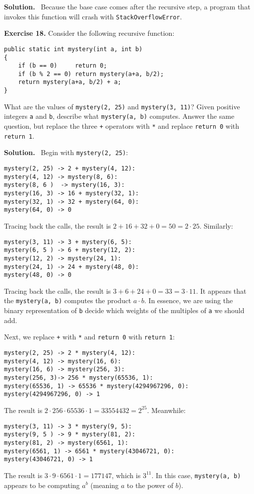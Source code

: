 \documentclass[12pt, a4paper]{article}
\newenvironment{ex}[2][Exercise]
{\par\medskip\noindent \textbf{#1 #2.}}
{\medskip}
\newenvironment{sol}[1][Solution]
{\par\medskip\noindent \textbf{#1.} }
{\medskip}
\begin{document}
	\begin{sol}
		\
		Because the base case comes after the recursive step, a program that invokes this
		function will crash with \texttt{StackOverflowError}.
	\end{sol}
	\begin{ex}{18}
		Consider the following recursive function:
		\begin{lstlisting}
public static int mystery(int a, int b)
{
	if (b == 0)		return 0;
	if (b % 2 == 0)	return mystery(a+a, b/2);
	return mystery(a+a, b/2) + a;
}
		\end{lstlisting}
	What are the values of \texttt{mystery(2, 25)} and \texttt{mystery(3, 11)}? Given positive integers
	\texttt{a} and \texttt{b}, describe what \texttt{mystery(a, b)} computes. Answer the same
	question, but replace the three \texttt{+} operators with \texttt{*} and replace
	\texttt{return 0} with \texttt{return 1}.
	\end{ex}
	\begin{sol}
		\
		Begin with \texttt{mystery(2, 25)}:
		\begin{lstlisting}
mystery(2, 25) -> 2 + mystery(4, 12):
mystery(4, 12) -> mystery(8, 6):
mystery(8, 6 )  -> mystery(16, 3):
mystery(16, 3) -> 16 + mystery(32, 1):
mystery(32, 1) -> 32 + mystery(64, 0):
mystery(64, 0) -> 0
		\end{lstlisting}
		Tracing back the calls, the result is $2 + 16 + 32 + 0 = 50 = 2\cdot 25$.
		Similarly:
		\begin{lstlisting}
mystery(3, 11) -> 3 + mystery(6, 5):
mystery(6, 5 ) -> 6 + mystery(12, 2):
mystery(12, 2) -> mystery(24, 1):
mystery(24, 1) -> 24 + mystery(48, 0):
mystery(48, 0) -> 0
		\end{lstlisting}
		Tracing back the calls, the result is $3 + 6 + 24 + 0 = 33 = 3\cdot 11$.
		It appears that the \texttt{mystery(a, b)} computes the product $a\cdot b$.
		In essence, we are using the binary representation of \texttt{b} decide which
		weights of the multiples of \texttt{a} we should add.

		Next, we replace \texttt{+} with \texttt{*} and \texttt{return 0} with \texttt{return 1}:
		\begin{lstlisting}
mystery(2, 25) -> 2 * mystery(4, 12):
mystery(4, 12) -> mystery(16, 6):
mystery(16, 6) -> mystery(256, 3):
mystery(256, 3)-> 256 * mystery(65536, 1):
mystery(65536, 1) -> 65536 * mystery(4294967296, 0):
mystery(4294967296, 0) -> 1
		\end{lstlisting}
		The result is $2 \cdot 256 \cdot 65536 \cdot 1 = 33554432 = 2^{25}$.
		Meanwhile:
		\begin{lstlisting}
mystery(3, 11) -> 3 * mystery(9, 5):
mystery(9, 5 ) -> 9 * mystery(81, 2):
mystery(81, 2) -> mystery(6561, 1):
mystery(6561, 1) -> 6561 * mystery(43046721, 0):
mystery(43046721, 0) -> 1
		\end{lstlisting}
		The result is $3\cdot 9\cdot 6561\cdot 1 = 177147$, which is $3^{11}$.
		In this case, \texttt{mystery(a, b)} appears to be computing $a^b$ (meaning
		$a$ to the power of $b$).
	\end{sol}
\end{document}
